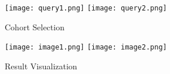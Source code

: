 

\begin{figure}
    \texttt{[image: query1.png]}
    \texttt{[image: query2.png]}
    \vspace{-1em}
    \caption{Cohort Selection}
    \label{fig:cohort}
    \vspace{-1em}
\end{figure}
\begin{figure*}
    \texttt{[image: image1.png]}
    \vspace{-0.2em}
    \texttt{[image: image2.png]}
    \vspace{-1em}
    \caption{Result Visualization}
    \label{fig:visual}
    \vspace{-1em}
\end{figure*}


